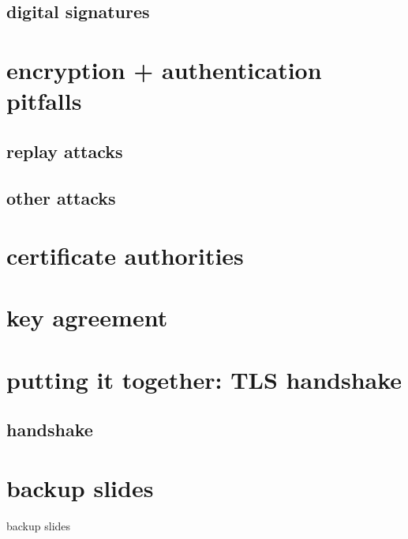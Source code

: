 

\subsection{digital signatures}



\section{encryption + authentication pitfalls}



\subsection{replay attacks}



\subsection{other attacks}



\section{certificate authorities}



\section{key agreement}



\section{putting it together: TLS handshake}


\subsection{handshake}



\section{backup slides}
\begin{frame}{backup slides}
\end{frame}


